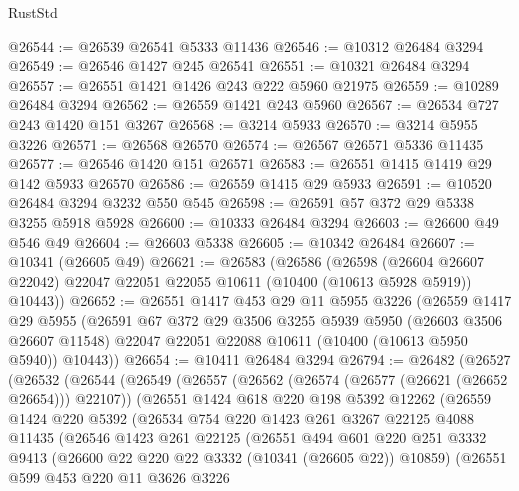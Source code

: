 \begin{lexlean}{RustStd}
\begin{coremodule}
@26544 := @26539 @26541 @5333 @11436
@26546 := @10312 @26484 @3294
@26549 := @26546 @1427 @245 @26541
@26551 := @10321 @26484 @3294
@26557 := @26551 @1421 @1426 @243 @222 @5960 @21975
@26559 := @10289 @26484 @3294
@26562 := @26559 @1421 @243 @5960
@26567 := @26534 @727 @243 @1420 @151 @3267
@26568 := @3214 @5933
@26570 := @3214 @5955 @3226
@26571 := @26568 @26570
@26574 := @26567 @26571 @5336 @11435
@26577 := @26546 @1420 @151 @26571
@26583 := @26551 @1415 @1419 @29 @142 @5933 @26570
@26586 := @26559 @1415 @29 @5933
@26591 := @10520 @26484 @3294 @3232 @550 @545
@26598 := @26591 @57 @372 @29 @5338 @3255 @5918 @5928
@26600 := @10333 @26484 @3294
@26603 := @26600 @49 @546 @49
@26604 := @26603 @5338
@26605 := @10342 @26484
@26607 := @10341 (@26605 @49)
@26621 := @26583
    (@26586
      (@26598
        (@26604 @26607 @22042)
        @22047
        @22051
        @22055
        @10611
        (@10400 (@10613 @5928 @5919))
        @10443))
@26652 := @26551
    @1417
    @453
    @29
    @11
    @5955
    @3226
    (@26559
      @1417
      @29
      @5955
      (@26591
        @67
        @372
        @29
        @3506
        @3255
        @5939
        @5950
        (@26603 @3506 @26607 @11548)
        @22047
        @22051
        @22088
        @10611
        (@10400 (@10613 @5950 @5940))
        @10443))
@26654 := @10411 @26484 @3294
@26794 := @26482
    (@26527
      (@26532
        (@26544
          (@26549
            (@26557
              (@26562 (@26574 (@26577 (@26621 (@26652 @26654))) @22107))
              (@26551
                @1424
                @618
                @220
                @198
                @5392
                @12262
                (@26559
                  @1424
                  @220
                  @5392
                  (@26534
                    @754
                    @220
                    @1423
                    @261
                    @3267
                    @22125
                    @4088
                    @11435
                    (@26546
                      @1423
                      @261
                      @22125
                      (@26551
                        @494
                        @601
                        @220
                        @251
                        @3332
                        @9413
                        (@26600 @22 @220 @22 @3332 (@10341 (@26605 @22)) @10859)
                        (@26551
                          @599
                          @453
                          @220
                          @11
                          @3626
                          @3226

\end{coremodule}
\end{lexlean}
